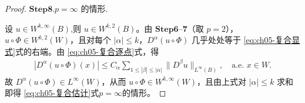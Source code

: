 \documentclass[../../main.tex]{subfiles}
\begin{document}
\begin{proof}
\noindent$\mathbf{Step}\bm{8}$.{\heiti $p=\infty$ 的情形.}

设 $u\in W^{k,\infty}(B)$,则 $u\in W^{k,2}(B)$。由 $\mathbf{Step}\bm{6}$--$\mathbf{7}$（取 $p=2$），$u\circ\Phi\in W^{k,2}(W)$，且对每个 $|\alpha|\leqslant k$，$D^{\alpha}(u\circ\Phi)$ 几乎处处等于 \eqref{eq:ch05-复合显式}式的右端。由 \eqref{eq:ch05-复合逐点}式，得
\begin{align*}
|D^{\alpha}(u\circ\Phi)(x)|
\leqslant C_{\alpha}\sum_{1\leqslant|\beta|\leqslant|\alpha|}\|D^{\beta}u\|_{L^{\infty}(B)},
\quad\text{a.e. }x\in W.
\end{align*}
故 $D^{\alpha}(u\circ\Phi)\in L^{\infty}(W)$，从而 $u\circ\Phi\in W^{k,\infty}(W)$，且由上式对 $|\alpha|\leqslant k$ 求和即得 \eqref{eq:ch05-复合估计}式$p=\infty$的情形。
\end{proof}
\end{document}
